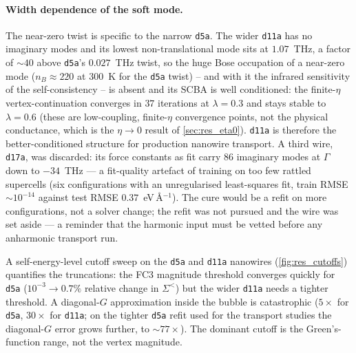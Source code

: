 \paragraph{Width dependence of the soft mode.} The near-zero twist is specific to the
narrow \texttt{d5a}. The wider \texttt{d11a} has no imaginary modes and its lowest
non-translational mode sits at $1.07$~THz, a factor of $\sim40$ above
\texttt{d5a}'s $0.027$~THz twist, so the huge Bose occupation of a near-zero mode
($n_B\approx220$ at $300$~K for the \texttt{d5a} twist) -- and with it the infrared
sensitivity of the self-consistency -- is absent and
its SCBA is well conditioned: the finite-$\eta$ vertex-continuation converges in
$37$ iterations at $\lambda=0.3$ and stays stable to $\lambda=0.6$ (these are
low-coupling, finite-$\eta$ convergence points, not the physical conductance, which
is the $\eta\to0$ result of \cref{sec:res_eta0}). \texttt{d11a} is therefore the
better-conditioned structure for production nanowire transport. A third wire,
\texttt{d17a}, was
discarded: its force constants as fit carry $86$ imaginary modes at $\Gamma$ down to
$-34$~THz --- a fit-quality artefact of training on too few rattled supercells (six
configurations with an unregularised least-squares fit, train RMSE
${\sim}10^{-14}$ against test RMSE $0.37$~eV\,\AA$^{-1}$). The cure would be a
refit on more configurations, not a solver change; the refit was not pursued and
the wire was set aside --- a reminder that the harmonic
input must be vetted before any anharmonic transport run.

A self-energy-level cutoff sweep on the \texttt{d5a} and \texttt{d11a}
nanowires (\cref{fig:res_cutoffs}) quantifies the truncations: the FC3
magnitude threshold converges quickly for \texttt{d5a}
($10^{-3}\to0.7\%$ relative change in $\Sigma^<$) but the wider
\texttt{d11a} needs a tighter threshold. A diagonal-$G$ approximation inside the
bubble is catastrophic ($5\times$ for \texttt{d5a}, $30\times$ for
\texttt{d11a}; on the tighter \texttt{d5a} refit used for the transport studies
the diagonal-$G$ error grows further, to ${\sim}77\times$). The dominant cutoff
is the Green's-function range, not the vertex magnitude.


